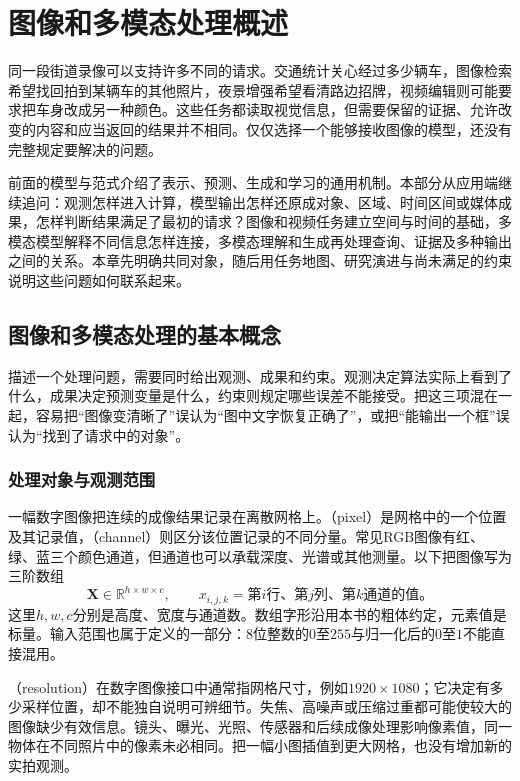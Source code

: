 \chapter{图像和多模态处理概述}
\label{chap:vision-overview}

同一段街道录像可以支持许多不同的请求。交通统计关心经过多少辆车，图像检索希望找回拍到某辆车的其他照片，夜景增强希望看清路边招牌，视频编辑则可能要求把车身改成另一种颜色。这些任务都读取视觉信息，但需要保留的证据、允许改变的内容和应当返回的结果并不相同。仅仅选择一个能够接收图像的模型，还没有完整规定要解决的问题。

前面的模型与范式介绍了表示、预测、生成和学习的通用机制。本部分从应用端继续追问：观测怎样进入计算，模型输出怎样还原成对象、区域、时间区间或媒体成果，怎样判断结果满足了最初的请求？图像和视频任务建立空间与时间的基础，多模态模型解释不同信息怎样连接，多模态理解和生成再处理查询、证据及多种输出之间的关系。本章先明确共同对象，随后用任务地图、研究演进与尚未满足的约束说明这些问题如何联系起来。

\section{图像和多模态处理的基本概念}
\label{sec:vision-overview-concepts}

描述一个处理问题，需要同时给出观测、成果和约束。观测决定算法实际上看到了什么，成果决定预测变量是什么，约束则规定哪些误差不能接受。把这三项混在一起，容易把“图像变清晰了”误认为“图中文字恢复正确了”，或把“能输出一个框”误认为“找到了请求中的对象”。

\subsection{处理对象与观测范围}
\label{sec:vision-overview-observations}

一幅数字图像把连续的成像结果记录在离散网格上。（pixel）是网格中的一个位置及其记录值，（channel）则区分该位置记录的不同分量。常见RGB图像有红、绿、蓝三个颜色通道，但通道也可以承载深度、光谱或其他测量。以下把图像写为三阶数组
\begin{equation}
  \bm{X}\in\mathbb{R}^{h\times w\times c},
  \qquad x_{i,j,k}=\text{第$i$行、第$j$列、第$k$通道的值。}
  \label{eq:vision-image-array}
\end{equation}
这里$h,w,c$分别是高度、宽度与通道数。数组字形沿用本书的粗体约定，元素值是标量。输入范围也属于定义的一部分：8位整数的$0$至$255$与归一化后的$0$至$1$不能直接混用。

（resolution）在数字图像接口中通常指网格尺寸，例如$1920\times1080$；它决定有多少采样位置，却不能独自说明可辨细节。失焦、高噪声或压缩过重都可能使较大的图像缺少有效信息。镜头、曝光、光照、传感器和后续成像处理影响像素值，同一物体在不同照片中的像素未必相同。把一幅小图插值到更大网格，也没有增加新的实拍观测。

